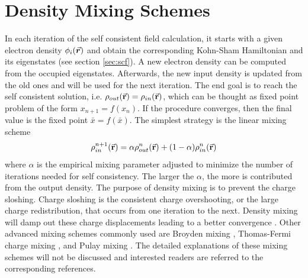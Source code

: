 \section{Density Mixing Schemes}
In each iteration of the self consistent field calculation, it starts with a given electron density $\phi_i(\va*{r})$ and obtain the corresponding Kohn-Sham Hamiltonian and its eigenstates (see section \ref{sec:scf}). A new electron density can be computed from the occupied eigenstates. Afterwards, the new input density is updated from the old ones and will be used for the next iteration. The end goal is to reach the self consistent solution, i.e. $\rho_{out}({\va{r}}) = \rho_{in}({\va{r}})$, which can be thought as fixed point problem of the form $x_{n+1} = f(x_n)$. If the procedure converges, then the final value is the fixed point $\bar{x} = f(\bar{x})$. The simplest strategy is the linear mixing  scheme \citep{Kerker1981}
\begin{equation}
    \rho_{in}^{n+1}({\va{r}}) = \alpha \rho_{out}^{n}({\va{r}}) + (1 - \alpha) \rho_{in}^{n}({\va{r}})
\end{equation}
where $\alpha$ is the empirical mixing parameter adjusted to minimize the number of iterations needed for self consistency. The larger the $\alpha$, the more is contributed from the output density. The purpose of density mixing is to prevent the charge sloshing. Charge sloshing is the consistent charge overshooting, or the  large charge redistribution, that occurs from one iteration to the next. Density mixing will damp out these charge displacements leading to a better convergence \citep{Johnson1988}. Other advanced mixing schemes commonly used are Broyden mixing \citep{Broyden1965}, Thomas-Fermi charge mixing \citep{Raczkowski2001}, and Pulay mixing \citep{Pulay1980, Kresse1996}. The detailed explanations of these mixing schemes will not be discussed and interested readers are referred to the corresponding references. 

